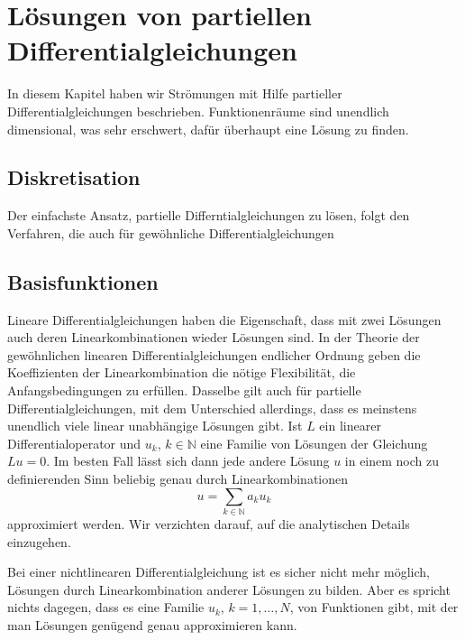 %
%
%
\section{Lösungen von partiellen Differentialgleichungen}
In diesem Kapitel haben wir Strömungen mit Hilfe partieller
Differentialgleichungen beschrieben.
Funktionenräume sind unendlich dimensional, was sehr erschwert,
dafür überhaupt eine Lösung zu finden.

\subsection{Diskretisation}
Der einfachste Ansatz, partielle Differntialgleichungen zu lösen,
folgt den Verfahren, die auch für gewöhnliche Differentialgleichungen
\cite{skript:mathsem-dgl} 

\subsection{Basisfunktionen}
Lineare Differentialgleichungen haben die Eigenschaft, dass 
mit zwei Lösungen auch deren Linearkombinationen wieder Lösungen sind.
In der Theorie der gewöhnlichen linearen Differentialgleichungen endlicher
Ordnung geben die Koeffizienten der Linearkombination die nötige Flexibilität,
die Anfangsbedingungen zu erfüllen.
Dasselbe gilt auch für partielle Differentialgleichungen, mit dem Unterschied
allerdings, dass es meinstens unendlich viele linear unabhängige Lösungen
gibt.
Ist $L$ ein linearer Differentialoperator und $u_k$, $k\in\mathbb N$ eine
Familie von Lösungen der Gleichung $Lu=0$.
Im besten Fall lässt sich dann jede andere Lösung $u$ in einem noch
zu definierenden Sinn beliebig genau durch Linearkombinationen
\[
u=\sum_{k\in\mathbb N} a_ku_k
\]
approximiert werden.
Wir verzichten darauf, auf die analytischen Details einzugehen.

Bei einer nichtlinearen Differentialgleichung ist es sicher nicht
mehr möglich, Lösungen durch Linearkombination anderer Lösungen
zu bilden.
Aber es spricht nichts dagegen, dass es eine Familie $u_k$, $k=1,\dots,N$,
von Funktionen gibt, mit der man Lösungen genügend genau approximieren
kann.

